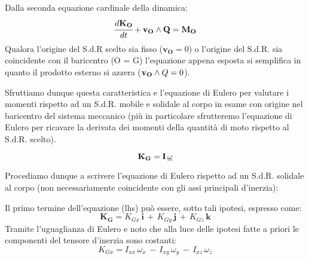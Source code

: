 	Dalla seconda equazione cardinale della dinamica:
	\[\cfrac{d\mathbf{K_O}}{dt} + \mathbf{v_O}\wedge \mathbf{Q} = \mathbf{M_O}\]
	Qualora l'origine del S.d.R scelto sia fisso ($\mathbf{v_O} = 0$) o l'origine del S.d.R. sia coincidente con il baricentro (O = G) l'equazione appena esposta si semplifica in quanto il prodotto esterno si azzera ($\mathbf{v_O}\wedge\mathbf\und{Q} = 0$).
	
	Sfruttiamo dunque questa caratteristica e l'equazione di Eulero per valutare i momenti rispetto ad un S.d.R. mobile e solidale al corpo in esame con origine nel baricentro del sistema meccanico (più in particolare sfrutteremo l'equazione di Eulero per ricavare la derivata dei momenti della quantità di moto rispetto al S.d.R. scelto).
	
	\[	\mathbf{K_G} = \mathbf{\mathbf{I}}\,\underline{\omega}\]
	
	Procediamo dunque a scrivere l'equazione di Eulero rispetto ad un S.d.R. solidale al corpo (non necessariamente coincidente con gli assi principali d'inerzia):
	
Il primo termine dell'equazione (lhs) può essere, sotto tali ipotesi, espresso come:
	\[\mathbf{K_G} = K_{Gx} \,\mathbf{i}\,+\,K_{Gy}\,\mathbf{j}\,+\,K_{Gz}\,\mathbf{k}\]
	Tramite l'uguaglianza di Eulero e noto che alla luce delle ipotesi fatte a priori le componenti del tensore d'inerzia sono costanti:
	\[K_{Gx} = I_{xx}\,\omega_x\,-\,I_{xy}\,\omega_y\,-\,I_{xz}\,\omega_z\]
	

